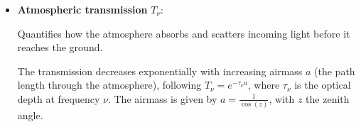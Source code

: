 \medskip

\begin{itemize}
    \item \textbf{Atmospheric transmission} $T_\nu$:
    
    Quantifies how the atmosphere absorbs and scatters incoming light before it reaches the ground. 
    
    \vspace{0.5em}
    \begin{minipage}{0.56\textwidth}
        The transmission decreases exponentially with increasing airmass $a$ (the path length through the atmosphere), following $T_\nu = e^{-\tau_\nu a}$, where $\tau_\nu$ is the optical depth at frequency $\nu$. The airmass is given by $a = \frac{1}{\cos(z)}$, with $z$ the zenith angle.
    \end{minipage}%
    \hfill
    \begin{minipage}{0.38\textwidth}
        \centering
    \end{minipage}


\end{itemize}

